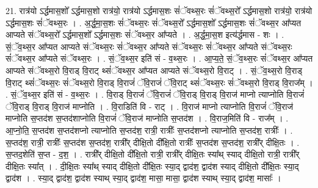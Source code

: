 \documentclass[17pt]{extarticle}
\begin{document}
21. रात्र॑यो ऽर्द्धमास॒शो᳚ ऽर्द्धमास॒शो रात्र॑यो॒ रात्र॑यो ऽर्द्धमास॒शः सं॑ॅवथ्स॒रः सं॑ॅवथ्स॒रो᳚ ऽर्द्धमास॒शो रात्र॑यो॒ रात्र॑यो ऽर्द्धमास॒शः सं॑ॅवथ्स॒रः । . अ॒र्द्ध॒मा॒स॒शः सं॑ॅवथ्स॒रः सं॑ॅवथ्स॒रो᳚ ऽर्द्धमास॒शो᳚ ऽर्द्धमास॒शः सं॑ॅवथ्स॒र आ᳚प्यत आप्यते संॅवथ्स॒रो᳚ ऽर्द्धमास॒शो᳚ ऽर्द्धमास॒शः सं॑ॅवथ्स॒र आ᳚प्यते । . अ॒र्द्ध॒मा॒स॒श इत्य॑र्द्धमास - शः । . सं॒ॅव॒थ्स॒र आ᳚प्यत आप्यते संॅवथ्स॒रः सं॑ॅवथ्स॒र आ᳚प्यते संॅवथ्स॒रः सं॑ॅवथ्स॒र आ᳚प्यते संॅवथ्स॒रः सं॑ॅवथ्स॒र आ᳚प्यते संॅवथ्स॒रः । . सं॒ॅव॒थ्स॒र इति॑ सं - व॒थ्स॒रः । . आ॒प्य॒ते॒ सं॒ॅव॒थ्स॒रः सं॑ॅवथ्स॒र आ᳚प्यत आप्यते संॅवथ्स॒रो वि॒राड् वि॒राट् थ्सं॑ॅवथ्स॒र आ᳚प्यत आप्यते संॅवथ्स॒रो वि॒राट् । . सं॒ॅव॒थ्स॒रो वि॒राड् वि॒राट् थ्सं॑ॅवथ्स॒रः सं॑ॅवथ्स॒रो वि॒राड् वि॒राजं॑ ॅवि॒राजं॑ ॅवि॒राट् 
थ्सं॑ॅवथ्स॒रः सं॑ॅवथ्स॒रो वि॒राड् वि॒राज᳚म् । . सं॒ॅव॒थ्स॒र इति॑ सं - व॒थ्स॒रः । . वि॒राड् वि॒राजं॑ ॅवि॒राजं॑ ॅवि॒राड् वि॒राड् वि॒राज॑ माप्नो त्याप्नोति वि॒राजं॑ ॅवि॒राड् वि॒राड् वि॒राज॑ माप्नोति । . वि॒राडिति॑ वि - राट् । . वि॒राज॑ माप्नो त्याप्नोति वि॒राजं॑ ॅवि॒राज॑ माप्नोति स॒प्तद॑श स॒प्तद॑शाप्नोति वि॒राजं॑ ॅवि॒राज॑ माप्नोति स॒प्तद॑श । . वि॒राज॒मिति॑ वि - राज᳚म् । . आ॒प्नो॒ति॒ स॒प्तद॑श स॒प्तद॑शप्नो त्याप्नोति स॒प्तद॑श॒ रात्री॒ रात्रीः᳚ स॒प्तद॑शप्नो त्याप्नोति स॒प्तद॑श॒ रात्रीः᳚ । . स॒प्तद॑श॒ रात्री॒ रात्रीः᳚ स॒प्तद॑श स॒प्तद॑श॒ रात्री᳚र् दीक्षि॒तो दी᳚क्षि॒तो रात्रीः᳚ स॒प्तद॑श स॒प्तद॑श॒ रात्री᳚र् दीक्षि॒तः । . स॒प्तद॒शेति॑ स॒प्त - द॒श॒ । . रात्री᳚र् दीक्षि॒तो दी᳚क्षि॒तो रात्री॒ रात्री᳚र् दीक्षि॒तः स्या᳚थ् स्याद् दीक्षि॒तो रात्री॒ रात्री᳚र् दीक्षि॒तः स्या᳚त् । . दी॒क्षि॒तः स्या᳚थ् स्याद् दीक्षि॒तो दी᳚क्षि॒तः स्या॒द् द्वाद॑श॒ द्वाद॑श स्याद् दीक्षि॒तो दी᳚क्षि॒तः स्या॒द् द्वाद॑श । . स्या॒द् द्वाद॑श॒ द्वाद॑श स्याथ् स्या॒द् द्वाद॑श॒ मासा॒ मासा॒ द्वाद॑श स्याथ् स्या॒द् द्वाद॑श॒ मासाः᳚ । \newline
\end{document}
